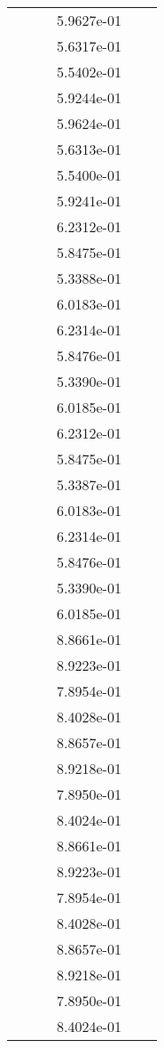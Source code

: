 \begin{xltabular}{\textwidth}{r|rS[table-format=1.3e+2]S[table-format=1.4e+2]S[table-format=1.4e+2]S[table-format=-1.5]}
&  &  & 5.9627e-01 & & \\
&  &  & 5.6317e-01 & & \\
&  &  & 5.5402e-01 & & \\
&  &  & 5.9244e-01 & & \\
&  &  & 5.9624e-01 & & \\
&  &  & 5.6313e-01 & & \\
&  &  & 5.5400e-01 & & \\
&  &  & 5.9241e-01 & & \\
&  &  & 6.2312e-01 & & \\
&  &  & 5.8475e-01 & & \\
&  &  & 5.3388e-01 & & \\
&  &  & 6.0183e-01 & & \\
&  &  & 6.2314e-01 & & \\
&  &  & 5.8476e-01 & & \\
&  &  & 5.3390e-01 & & \\
&  &  & 6.0185e-01 & & \\
&  &  & 6.2312e-01 & & \\
&  &  & 5.8475e-01 & & \\
&  &  & 5.3387e-01 & & \\
&  &  & 6.0183e-01 & & \\
&  &  & 6.2314e-01 & & \\
&  &  & 5.8476e-01 & & \\
&  &  & 5.3390e-01 & & \\
&  &  & 6.0185e-01 & & \\
&  &  & 8.8661e-01 & & \\
&  &  & 8.9223e-01 & & \\
&  &  & 7.8954e-01 & & \\
&  &  & 8.4028e-01 & & \\
&  &  & 8.8657e-01 & & \\
&  &  & 8.9218e-01 & & \\
&  &  & 7.8950e-01 & & \\
&  &  & 8.4024e-01 & & \\
&  &  & 8.8661e-01 & & \\
&  &  & 8.9223e-01 & & \\
&  &  & 7.8954e-01 & & \\
&  &  & 8.4028e-01 & & \\
&  &  & 8.8657e-01 & & \\
&  &  & 8.9218e-01 & & \\
&  &  & 7.8950e-01 & & \\
&  &  & 8.4024e-01 & & \\

\end{xltabular}
